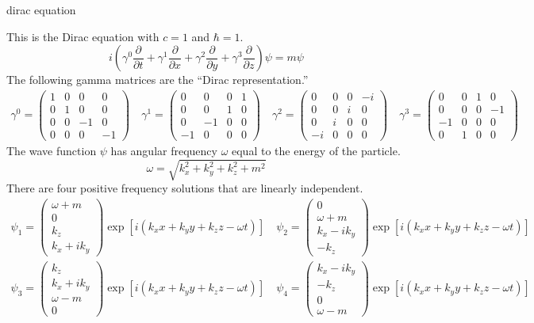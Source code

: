 \documentclass[12pt]{article}
\begin{document}
\begin{center}
{\sc dirac equation}
\end{center}

\noindent
This is the Dirac equation with $c=1$ and $\hbar=1$.
$$
i\left(
\gamma^0\frac{\partial}{\partial t}+
\gamma^1\frac{\partial}{\partial x}+
\gamma^2\frac{\partial}{\partial y}+
\gamma^3\frac{\partial}{\partial z}
\right)\psi
=m\psi
$$
%
%
The following gamma matrices are the ``Dirac representation.''
\begin{gather*}
\gamma^0=\begin{pmatrix}1&0&0&0\\0&1&0&0\\0&0&-1&0\\0&0&0&-1\end{pmatrix}\quad
\gamma^1=\begin{pmatrix}0&0&0&1\\0&0&1&0\\0&-1&0&0\\-1&0&0&0\end{pmatrix}\quad
\gamma^2=\begin{pmatrix}0&0&0&-i\\0&0&i&0\\0&i&0&0\\-i&0&0&0\end{pmatrix}\quad
\gamma^3=\begin{pmatrix}0&0&1&0\\0&0&0&-1\\-1&0&0&0\\0&1&0&0\end{pmatrix}
\end{gather*}
%
%
The wave function $\psi$ has angular frequency $\omega$ equal to the energy of the particle.
$$
\omega=\sqrt{k_x^2+k_y^2+k_z^2+m^2}
$$
%
%
There are four positive frequency solutions that are linearly independent.
\begin{gather*}
\psi_1=\begin{pmatrix}\omega+m\\0\\k_z\\k_x+ik_y\end{pmatrix}
\exp[i(k_xx+k_yy+k_zz-\omega t)]
\quad
\psi_2=\begin{pmatrix}0\\ \omega+m\\k_x-ik_y\\-k_z\end{pmatrix}
\exp[i(k_xx+k_yy+k_zz-\omega t)]
\\
\psi_3=\begin{pmatrix}k_z\\k_x+ik_y\\ \omega-m\\0\end{pmatrix}
\exp[i(k_xx+k_yy+k_zz-\omega t)]
\quad
\psi_4=\begin{pmatrix}k_x-ik_y\\-k_z\\0\\ \omega-m\end{pmatrix}
\exp[i(k_xx+k_yy+k_zz-\omega t)]
\end{gather*}
\end{document}
